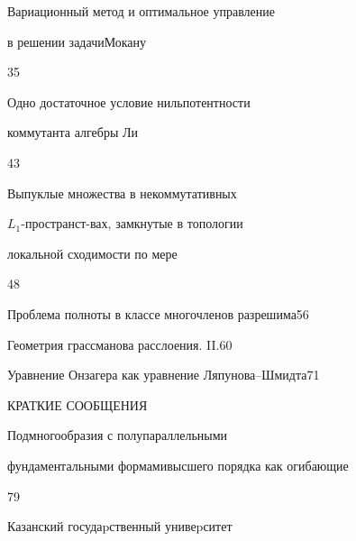

{Вариационный метод и оптимальное управление 


в решении задачи\newline Мокану}{35}




{Одно достаточное условие нильпотентности 


коммутанта алгебры Ли}{43}




{Выпуклые множества в некоммутативных 


$L_1$-пространст-\newline вах, замкнутые в топологии 


локальной сходимости по мере}{48}




{Проблема полноты в классе многочленов разрешима}{56}




{Геометрия грассманова расслоения. II.}{60}




{Уравнение Онзагера как уравнение Ляпунова--Шмидта}{71}


\bigskip





\centerline{КРАТКИЕ СООБЩЕНИЯ}


\bigskip










{Подмногообразия с полупараллельными


фундаментальными формами\newline высшего порядка как огибающие}{79}











\vfill


\noindent\raisebox{2pt}{\copyright} Казанский госудаpственный унивеpситет





